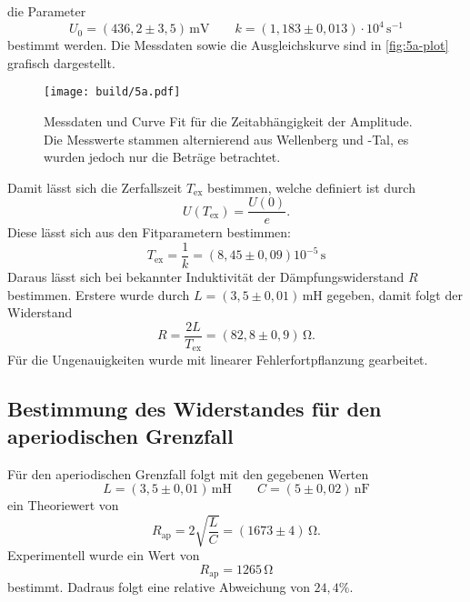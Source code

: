 die Parameter
\begin{equation}
	U_0 = (436,2 \pm 3,5) \, \si{\milli\volt}
	\qquad
	k = (1,183 \pm 0,013) \cdot 10^4 \, \si{\second^{-1}}
\end{equation}
bestimmt werden. Die Messdaten sowie die Ausgleichskurve sind in \autoref{fig:5a-plot}
grafisch dargestellt.
\begin{figure}[H]
	\centering
	\texttt{[image: build/5a.pdf]}
	\caption{Messdaten und Curve Fit für die Zeitabhängigkeit der Amplitude. Die
		Messwerte stammen alternierend aus Wellenberg und -Tal, es wurden jedoch
	nur die Beträge betrachtet.}
	\label{fig:5a-plot}
\end{figure}
Damit lässt sich die Zerfallszeit $T_\text{ex}$ bestimmen, welche definiert ist durch
\begin{equation}
	U\left( T_\text{ex} \right) = \frac{U(0)}{e}.
\end{equation}
Diese lässt sich aus den Fitparametern bestimmen:
\begin{equation}
	T_\text{ex} = \frac{1}{k} = (8,45 \pm 0,09)10^{-5} \, \si{\second}
\end{equation}
Daraus lässt sich bei bekannter Induktivität der Dämpfungswiderstand $R$ bestimmen.
Erstere wurde durch $L = (3,5 \pm 0,01) \, \si{\milli\henry}$ gegeben, damit folgt der
Widerstand
\begin{equation}
	R = \frac{2L}{T_\text{ex}} = (82,8 \pm 0,9) \, \si{\ohm}.
\end{equation}
Für die Ungenauigkeiten wurde mit linearer Fehlerfortpflanzung gearbeitet.

\subsection{Bestimmung des Widerstandes für den aperiodischen Grenzfall}
\label{sec:Bestimmung des Widerstandes für den Aperiodischen Grenzfall}
Für den aperiodischen Grenzfall folgt mit den gegebenen Werten
\begin{equation}
	L = (3,5 \pm 0,01) \, \si{\milli\henry}
	\qquad
	C = (5 \pm 0,02) \, \si{\nano\farad}
\end{equation}
ein Theoriewert von
\begin{equation}
	R_\text{ap} = 2 \sqrt{\frac{L}{C}} = (1673 \pm 4) \, \si{\ohm}.
\end{equation}
Experimentell wurde ein Wert von
\begin{equation}
	R_\text{ap} = 1265 \, \si{\ohm}
\end{equation}
bestimmt. Dadraus folgt eine relative Abweichung von $24,4 \%$.

